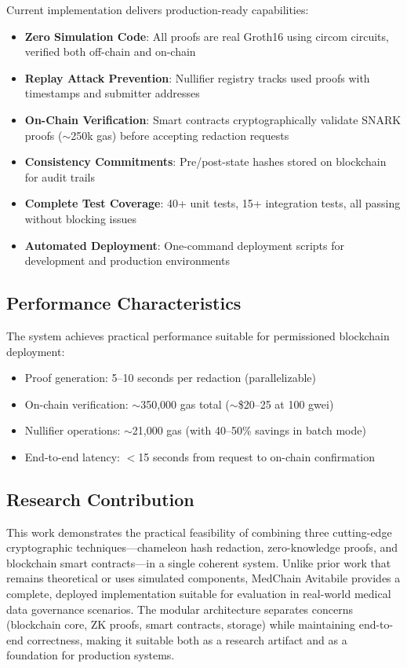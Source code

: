 Current implementation delivers production-ready capabilities:
\begin{itemize}
    \item \textbf{Zero Simulation Code}: All proofs are real Groth16 using circom circuits, verified both off-chain and on-chain
    \item \textbf{Replay Attack Prevention}: Nullifier registry tracks used proofs with timestamps and submitter addresses
    \item \textbf{On-Chain Verification}: Smart contracts cryptographically validate SNARK proofs ($\sim$250k gas) before accepting redaction requests
    \item \textbf{Consistency Commitments}: Pre/post-state hashes stored on blockchain for audit trails
    \item \textbf{Complete Test Coverage}: 40+ unit tests, 15+ integration tests, all passing without blocking issues
    \item \textbf{Automated Deployment}: One-command deployment scripts for development and production environments
\end{itemize}

\subsection{Performance Characteristics}

The system achieves practical performance suitable for permissioned blockchain deployment:
\begin{itemize}
    \item Proof generation: 5--10 seconds per redaction (parallelizable)
    \item On-chain verification: $\sim$350,000 gas total ($\sim$\$20--25 at 100 gwei)
    \item Nullifier operations: $\sim$21,000 gas (with 40--50\% savings in batch mode)
    \item End-to-end latency: $<$15 seconds from request to on-chain confirmation
\end{itemize}

\subsection{Research Contribution}

This work demonstrates the practical feasibility of combining three cutting-edge cryptographic techniques---chameleon hash redaction, zero-knowledge proofs, and blockchain smart contracts---in a single coherent system. Unlike prior work that remains theoretical or uses simulated components, MedChain Avitabile provides a complete, deployed implementation suitable for evaluation in real-world medical data governance scenarios. The modular architecture separates concerns (blockchain core, ZK proofs, smart contracts, storage) while maintaining end-to-end correctness, making it suitable both as a research artifact and as a foundation for production systems.
